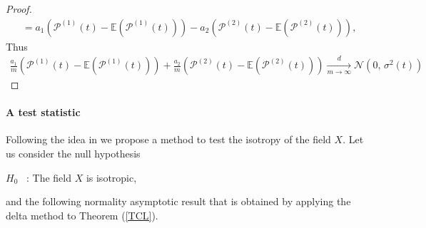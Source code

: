 \documentclass[12pt]{article}
\theoremstyle{Theorem}
\begin{document}
\begin{proof}
\begin{align*}
&=  a_{1}\left(\mathcal{P}^{\scriptscriptstyle (1)}(t) - \mathbb{E}\left(\mathcal{P}^{\scriptscriptstyle (1)}(t)\right)\right) - a_{2}\left(\mathcal{P}^{\scriptscriptstyle (2)}(t) - \mathbb{E}\left(\mathcal{P}^{\scriptscriptstyle (2)}(t)\right)\right),
\end{align*}
Thus
\begin{align*}
\frac{a_{1}}{m}\left(\mathcal{P}^{\scriptscriptstyle (1)}(t) - \mathbb{E}\left(\mathcal{P}^{\scriptscriptstyle (1)}(t)\right)\right) + \frac{a_{2}}{m}\left(\mathcal{P}^{\scriptscriptstyle (2)}(t) - \mathbb{E}\left(\mathcal{P}^{\scriptscriptstyle (2)}(t)\right)\right) \xrightarrow[m \to \infty]{d} \mathcal{N}\left(0,\,\sigma^{2}(t)\right) 
\end{align*}
\end{proof}
\paragraph{A test statistic} Following the idea  in \cite{bierme2019}  we propose a method to test the isotropy of the field $X$.
Let us consider the null hypothesis
\begin{center}
  $H_{0}$ \, :\; The field $X$ is isotropic,
\end{center}
and the following normality asymptotic result that is obtained by applying the delta method to Theorem (\textcolor{blue}{\ref{TCL}}).
\end{document}
